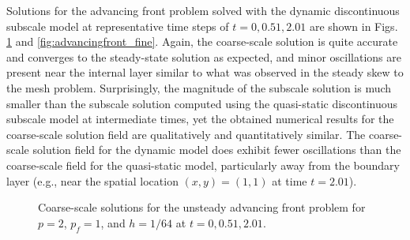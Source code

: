 \documentclass[11pt]{article}
\begin{document}
Solutions for the advancing front problem solved with the dynamic discontinuous subscale model at representative time steps of $t = 0, 0.51, 2.01$ are shown in Figs. \ref{fig:advancingfront_coarse} and \ref{fig:advancingfront_fine}.  Again, the coarse-scale solution is quite accurate and converges to the steady-state solution as expected, and minor oscillations are present near the internal layer similar to what was observed in the steady skew to the mesh problem.  Surprisingly, the magnitude of the subscale solution is much smaller than the subscale solution computed using the quasi-static discontinuous subscale model at intermediate times, yet the obtained numerical results for the coarse-scale solution field are qualitatively and quantitatively similar.  The coarse-scale solution field for the dynamic model does exhibit fewer oscillations than the coarse-scale field for the quasi-static model, particularly away from the boundary layer (e.g., near the spatial location $(x,y) = (1,1)$ at time $t = 2.01$).

\begin{figure}[t]
  \begin{center}
	\caption{Coarse-scale solutions for the unsteady advancing front problem for $p = 2$, $p_f = 1$, and $h = 1/64$ at $t = 0, 0.51, 2.01$.}
	\label{fig:advancingfront_coarse}
  \end{center}
\end{figure}
\end{document}
